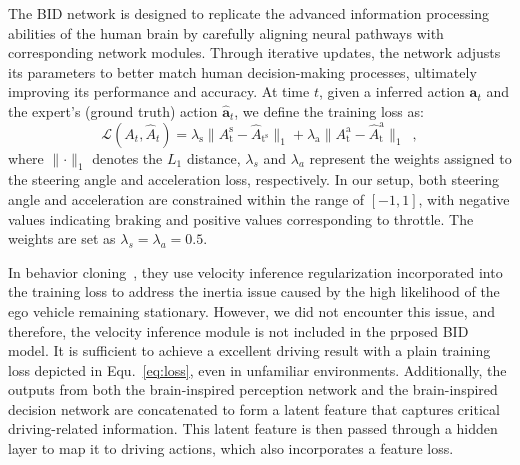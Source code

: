 \hspace{1pc}The BID network is designed to replicate the advanced information processing abilities of the human brain by carefully aligning neural pathways with corresponding network modules. 
Through iterative updates, the network adjusts its parameters to better match human decision-making processes, ultimately improving its performance and accuracy.
%
At time $t$, given a inferred action $\mathbf{a}_{t}$ and the expert's (ground truth) action $\hat{\mathbf{a}}_{t}$, we define the training loss as:
\begin{equation}\label{eq:loss}
	\mathcal{L}(A_t, \hat{A}_t) 
	= \lambda_{\text{s}} \lVert A_{\text{t}}^\text{s}-\hat{A}_{\text{t}^\text{s}} \rVert_{1}
	+ \lambda_{\text{a}}\lVert A_{\text{t}}^\text{a}-\hat{A}_{\text{t}}^\text{a}\rVert_{1} \enspace ,
\end{equation}
where $\lVert\cdot\rVert_{1}$ denotes the $L_1$ distance, $\lambda_{s}$ and $\lambda_a$ represent the weights assigned to the steering angle and acceleration loss, respectively.
In our setup, both steering angle and acceleration are constrained within the range of $[-1, 1]$, with negative values indicating braking and positive values corresponding to throttle.
The weights are set as $\lambda_{s} = \lambda_{a} = 0.5$. 


In behavior cloning~\cite{Codevilla:2019}, they use velocity inference regularization incorporated into the training loss to address the inertia issue caused by the high likelihood of the ego vehicle remaining stationary.
However, we did not encounter this issue, and therefore, the velocity inference module is not included in the prposed BID model.
It is sufficient to achieve a excellent driving result with a plain training loss depicted in Equ.~\ref{eq:loss}, even in unfamiliar environments.
%
Additionally, the outputs from both the brain-inspired perception network and the brain-inspired decision network are concatenated to form a latent feature that captures critical driving-related information. 
This latent feature is then passed through a hidden layer to map it to driving actions, which also incorporates a feature loss.


%

